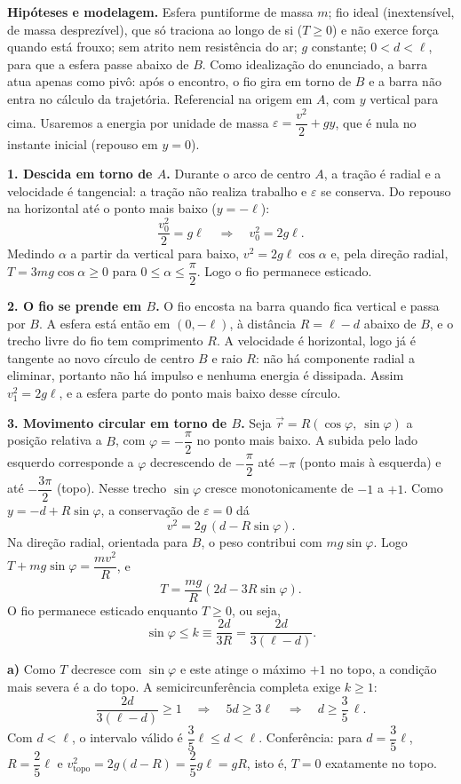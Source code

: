 \documentclass{article}%
\begin{document}
\textbf{Hipóteses e modelagem.} Esfera puntiforme de massa $m$; fio ideal (inextensível, de massa desprezível), que só traciona ao longo de si ($T\ge 0$) e não exerce força quando está frouxo; sem atrito nem resistência do ar; $g$ constante; $0<d<\ell$, para que a esfera passe abaixo de $B$. Como idealização do enunciado, a barra atua apenas como pivô: após o encontro, o fio gira em torno de $B$ e a barra não entra no cálculo da trajetória. Referencial na origem em $A$, com $y$ vertical para cima. Usaremos a energia por unidade de massa $\varepsilon=\dfrac{v^2}{2}+gy$, que é nula no instante inicial (repouso em $y=0$).

\textbf{1. Descida em torno de $A$.} Durante o arco de centro $A$, a tração é radial e a velocidade é tangencial: a tração não realiza trabalho e $\varepsilon$ se conserva. Do repouso na horizontal até o ponto mais baixo ($y=-\ell$):
\[
\frac{v_0^2}{2}=g\ell\quad\Rightarrow\quad v_0^2=2g\ell .
\]
Medindo $\alpha$ a partir da vertical para baixo, $v^2=2g\ell\cos\alpha$ e, pela direção radial, $T=3mg\cos\alpha\ge 0$ para $0\le\alpha\le\dfrac{\pi}{2}$. Logo o fio permanece esticado.

\textbf{2. O fio se prende em $B$.} O fio encosta na barra quando fica vertical e passa por $B$. A esfera está então em $(0,-\ell)$, à distância $R=\ell-d$ abaixo de $B$, e o trecho livre do fio tem comprimento $R$. A velocidade é horizontal, logo já é tangente ao novo círculo de centro $B$ e raio $R$: não há componente radial a eliminar, portanto não há impulso e nenhuma energia é dissipada. Assim $v_1^2=2g\ell$, e a esfera parte do ponto mais baixo desse círculo.

\textbf{3. Movimento circular em torno de $B$.} Seja $\vec r=R(\cos\varphi,\ \sin\varphi)$ a posição relativa a $B$, com $\varphi=-\dfrac{\pi}{2}$ no ponto mais baixo. A subida pelo lado esquerdo corresponde a $\varphi$ decrescendo de $-\dfrac{\pi}{2}$ até $-\pi$ (ponto mais à esquerda) e até $-\dfrac{3\pi}{2}$ (topo). Nesse trecho $\sin\varphi$ cresce monotonicamente de $-1$ a $+1$. Como $y=-d+R\sin\varphi$, a conservação de $\varepsilon=0$ dá
\[
v^2=2g\,(d-R\sin\varphi).
\]
Na direção radial, orientada para $B$, o peso contribui com $mg\sin\varphi$. Logo $T+mg\sin\varphi=\dfrac{mv^2}{R}$, e
\[
T=\frac{mg}{R}\left(2d-3R\sin\varphi\right).
\]
O fio permanece esticado enquanto $T\ge 0$, ou seja,
\[
\sin\varphi\le k\equiv\frac{2d}{3R}=\frac{2d}{3(\ell-d)} .
\]

\textbf{a)} Como $T$ decresce com $\sin\varphi$ e este atinge o máximo $+1$ no topo, a condição mais severa é a do topo. A semicircunferência completa exige $k\ge 1$:
\[
\frac{2d}{3(\ell-d)}\ge 1\quad\Rightarrow\quad 5d\ge 3\ell\quad\Rightarrow\quad d\ge\frac{3}{5}\,\ell .
\]
Com $d<\ell$, o intervalo válido é $\dfrac{3}{5}\ell\le d<\ell$. Conferência: para $d=\dfrac{3}{5}\ell$, $R=\dfrac{2}{5}\ell$ e $v_{\text{topo}}^2=2g(d-R)=\dfrac{2}{5}g\ell=gR$, isto é, $T=0$ exatamente no topo.
\end{document}
